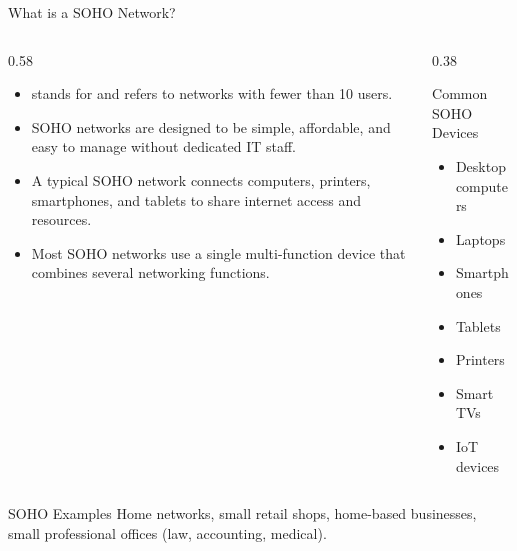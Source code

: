 \documentclass[aspectratio=169]{beamer}  %
\begin{document}

\begin{frame}{What is a SOHO Network?}
    \begin{columns}[T]
        \begin{column}{0.58\textwidth}
            \begin{itemize}
                \item {} stands for  and refers to networks with fewer than 10 users.
                \item SOHO networks are designed to be simple, affordable, and easy to manage without dedicated IT staff.
                \item A typical SOHO network connects computers, printers, smartphones, and tablets to share internet access and resources.
                \item Most SOHO networks use a single multi-function device that combines several networking functions.
            \end{itemize}
        \end{column}
        \begin{column}{0.38\textwidth}
            \begin{block}{Common SOHO Devices}
                \begin{itemize}
                    \item Desktop computers
                    \item Laptops
                    \item Smartphones
                    \item Tablets
                    \item Printers
                    \item Smart TVs
                    \item IoT devices
                \end{itemize}
            \end{block}
        \end{column}
    \end{columns}
    
    \begin{exampleblock}{SOHO Examples}
        Home networks, small retail shops, home-based businesses, small professional offices (law, accounting, medical).
    \end{exampleblock}
\end{frame}
\end{document}
